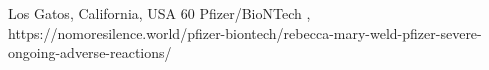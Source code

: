           {Los Gatos, California, USA}
          {60}
          {Pfizer/BioNTech}
          {}
          {
            ,
          }
          {https://nomoresilence.world/pfizer-biontech/rebecca-mary-weld-pfizer-severe-ongoing-adverse-reactions/}


